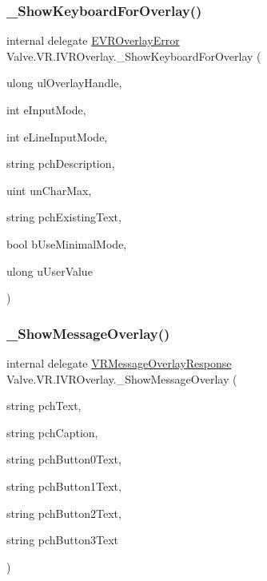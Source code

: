 \mbox{\label{struct_valve_1_1_v_r_1_1_i_v_r_overlay_ad13a58d49b69b35ac76962579290372f}} 
\subsubsection{\texorpdfstring{\_ShowKeyboardForOverlay()}{\_ShowKeyboardForOverlay()}}
{\footnotesize\ttfamily internal delegate \mbox{\hyperlink{namespace_valve_1_1_v_r_aaee5c5144f42b7969d45b854f51b0c18}{E\+V\+R\+Overlay\+Error}} Valve.\+V\+R.\+I\+V\+R\+Overlay.\+\_\+\+Show\+Keyboard\+For\+Overlay (\begin{DoxyParamCaption}\item[{ulong}]{ul\+Overlay\+Handle,  }\item[{int}]{e\+Input\+Mode,  }\item[{int}]{e\+Line\+Input\+Mode,  }\item[{string}]{pch\+Description,  }\item[{uint}]{un\+Char\+Max,  }\item[{string}]{pch\+Existing\+Text,  }\item[{bool}]{b\+Use\+Minimal\+Mode,  }\item[{ulong}]{u\+User\+Value }\end{DoxyParamCaption})}

\mbox{\label{struct_valve_1_1_v_r_1_1_i_v_r_overlay_afadb2a0056062a8d7e051a7d961f782e}} 
\subsubsection{\texorpdfstring{\_ShowMessageOverlay()}{\_ShowMessageOverlay()}}
{\footnotesize\ttfamily internal delegate \mbox{\hyperlink{namespace_valve_1_1_v_r_a034ef9b0267f2fa2e4a227bc2c73473f}{V\+R\+Message\+Overlay\+Response}} Valve.\+V\+R.\+I\+V\+R\+Overlay.\+\_\+\+Show\+Message\+Overlay (\begin{DoxyParamCaption}\item[{string}]{pch\+Text,  }\item[{string}]{pch\+Caption,  }\item[{string}]{pch\+Button0\+Text,  }\item[{string}]{pch\+Button1\+Text,  }\item[{string}]{pch\+Button2\+Text,  }\item[{string}]{pch\+Button3\+Text }\end{DoxyParamCaption})}

